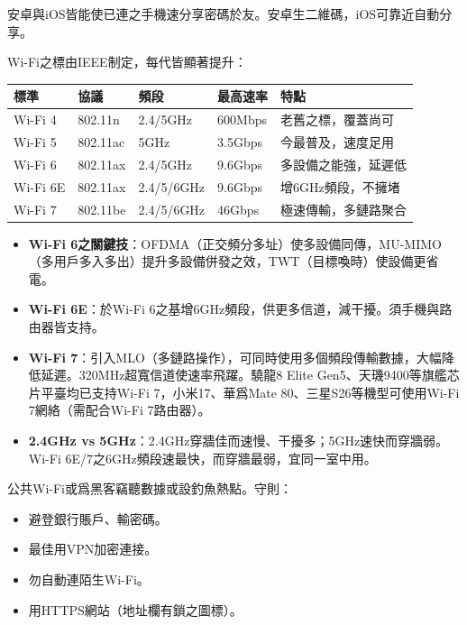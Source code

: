 安卓與iOS皆能使已連之手機速分享密碼於友。安卓生二維碼，iOS可靠近自動分享。


Wi-Fi之標由IEEE制定，每代皆顯著提升：

\begin{center}
\begin{tabularx}{\linewidth}{|X|X|X|X|X|}
\hline
\textbf{標準} & \textbf{協議} & \textbf{頻段} & \textbf{最高速率} & \textbf{特點} \tabularnewline
\hline
Wi-Fi 4 & 802.11n & 2.4/5GHz & 600Mbps & 老舊之標，覆蓋尚可 \tabularnewline
Wi-Fi 5 & 802.11ac & 5GHz & 3.5Gbps & 今最普及，速度足用 \tabularnewline
Wi-Fi 6 & 802.11ax & 2.4/5GHz & 9.6Gbps & 多設備之能強，延遲低 \tabularnewline
Wi-Fi 6E & 802.11ax & 2.4/5/6GHz & 9.6Gbps & 增6GHz頻段，不擁堵 \tabularnewline
Wi-Fi 7 & 802.11be & 2.4/5/6GHz & 46Gbps & 極速傳輸，多鏈路聚合 \tabularnewline
\hline
\end{tabularx}
\end{center}

\begin{itemize}
  \item \textbf{Wi-Fi 6之關鍵技}：OFDMA（正交頻分多址）使多設備同傳，MU-MIMO（多用戶多入多出）提升多設備併發之效，TWT（目標喚時）使設備更省電。
  \item \textbf{Wi-Fi 6E}：於Wi-Fi 6之基增6GHz頻段，供更多信道，減干擾。須手機與路由器皆支持。
  \item \textbf{Wi-Fi 7}：引入MLO（多鏈路操作），可同時使用多個頻段傳輸數據，大幅降低延遲。320MHz超寬信道使速率飛躍。驍龍8 Elite Gen5、天璣9400等旗艦芯片平臺均已支持Wi-Fi 7，小米17、華爲Mate 80、三星S26等機型可使用Wi-Fi 7網絡（需配合Wi-Fi 7路由器）。
  \item \textbf{2.4GHz vs 5GHz}：2.4GHz穿牆佳而速慢、干擾多；5GHz速快而穿牆弱。Wi-Fi 6E/7之6GHz頻段速最快，而穿牆最弱，宜同一室中用。
\end{itemize}


公共Wi-Fi或爲黑客竊聽數據或設釣魚熱點。守則：

\begin{itemize}
  \item 避登銀行賬戶、輸密碼。
  \item 最佳用VPN加密連接。
  \item 勿自動連陌生Wi-Fi。
  \item 用HTTPS網站（地址欄有鎖之圖標）。
\end{itemize}


